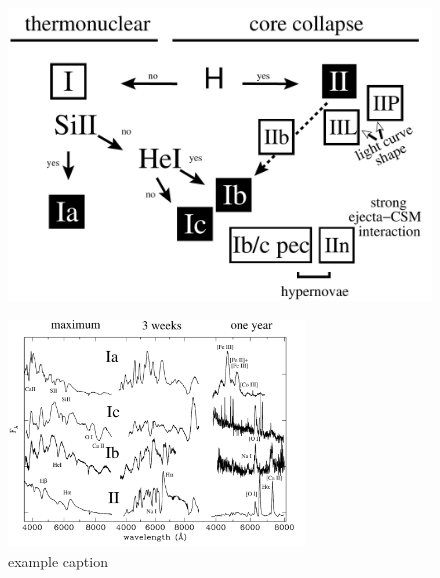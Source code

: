 \begin{figure}[htb] %
   \centering
   \includegraphics[width=.7\textwidth]{chapter_intro/plots/sn_classification.pdf} 
   \caption{}
   \label{fig:sn_classification}
\end{figure}

\begin{figure}[htb] %
   \centering
   \includegraphics[width=0.7\textwidth]{chapter_intro/plots/sn_class_spectra.pdf} 
   \caption{example caption}
   \label{fig:sn_class_spectra}
\end{figure}


